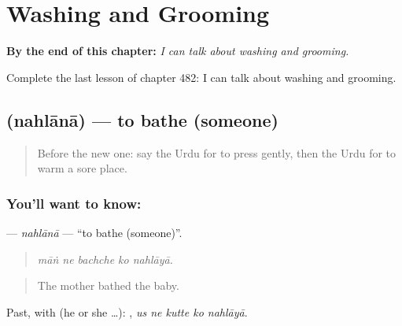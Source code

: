 
\chapter{Washing and Grooming}
\label{ch:ur-washing-and-grooming}

\begin{chapteropening}
\textbf{By the end of this chapter:} \emph{I can talk about washing and grooming.}

Complete the last lesson of chapter 482: I can talk about washing and grooming.
\end{chapteropening}

\section[\texorpdfstring{\ur{نہلانا} (nahlānā)}{نہلانا (nahlānā)}]{ (nahlānā) — to bathe (someone)}

\label{lesson:UR-C482-nahlana}



\begin{quote}
Before the new one: say the Urdu for to press gently, then the Urdu for to warm a sore place.
\end{quote}

\subsection*{You'll want to know: }
\textbf{} — \emph{nahlānā} — \textquotedblleft{}to bathe (someone)\textquotedblright{}.

\begin{quote}
    
\end{quote}

\begin{quote}
\emph{māṅ ne bachche ko nahlāyā.}
\end{quote}

\begin{quote}
The mother bathed the baby.
\end{quote}

Past, with  (he or she …):     , \emph{us ne kutte ko nahlāyā}.

